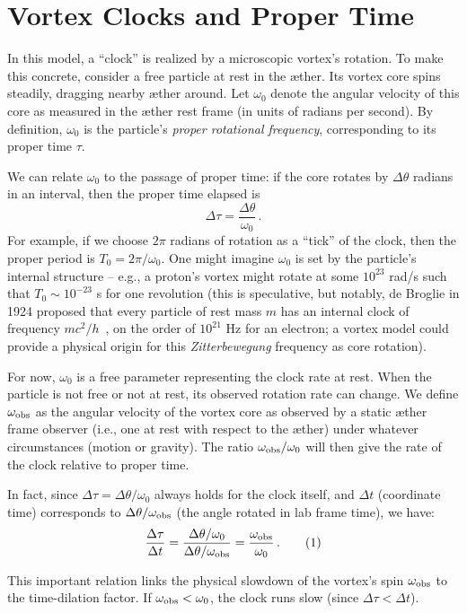 
\section{Vortex Clocks and Proper Time}

In this model, a “clock” is realized by a microscopic vortex’s rotation. To make this concrete, consider a free particle at rest in the æther. Its vortex core spins steadily, dragging nearby æther around. Let $\omega_0$ denote the angular velocity of this core as measured in the æther rest frame (in units of radians per second). By definition, $\omega_0$ is the particle’s \emph{proper rotational frequency}, corresponding to its proper time $\tau$.

We can relate $\omega_0$ to the passage of proper time: if the core rotates by $\Delta \theta$ radians in an interval, then the proper time elapsed is
\[
\Delta \tau = \frac{\Delta \theta}{\omega_0} \,.
\]
For example, if we choose $2\pi$ radians of rotation as a “tick” of the clock, then the proper period is $T_0 = 2\pi/\omega_0$. One might imagine $\omega_0$ is set by the particle’s internal structure – e.g., a proton’s vortex might rotate at some $10^{23}$ rad/s such that $T_0 \sim 10^{-23}$ s for one revolution (this is speculative, but notably, de Broglie in 1924 proposed that every particle of rest mass $m$ has an internal clock of frequency $mc^2/h$~\cite{deBroglie1924-frequency}, on the order of $10^{21}$ Hz for an electron; a vortex model could provide a physical origin for this \emph{Zitterbewegung} frequency as core rotation).

For now, $\omega_0$ is a free parameter representing the clock rate at rest. When the particle is not free or not at rest, its observed rotation rate can change. We define $\omega_{\rm obs}$ as the angular velocity of the vortex core as observed by a static æther frame observer (i.e., one at rest with respect to the æther) under whatever circumstances (motion or gravity). The ratio $\omega_{\rm obs}/\omega_0$ will then give the rate of the clock relative to proper time.

In fact, since $\Delta \tau = \Delta \theta / \omega_0$ always holds for the clock itself, and $\Delta t$ (coordinate time) corresponds to $\Delta \theta / \omega_{\rm obs}$ (the angle rotated in lab frame time), we have:
\[
\frac{\Delta \tau}{\Delta t} = \frac{\Delta \theta / \omega_0}{\Delta \theta / \omega_{\rm obs}} = \frac{\omega_{\rm obs}}{\omega_0} \,. \tag{1}
\]

This important relation links the physical slowdown of the vortex’s spin $\omega_{\rm obs}$ to the time-dilation factor. If $\omega_{\rm obs} < \omega_0$, the clock runs slow (since $\Delta \tau < \Delta t$).

